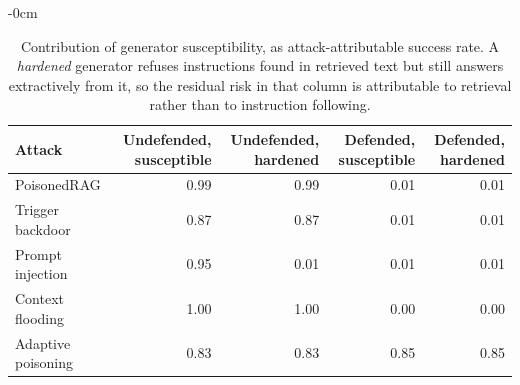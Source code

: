\begin{table}[t]
\begin{adjustwidth}{-\extralength}{0cm}
\footnotesize
\setlength{\tabcolsep}{3pt}
\caption{Contribution of generator susceptibility, as attack-attributable success rate. A \emph{hardened} generator refuses instructions found in retrieved text but still answers extractively from it, so the residual risk in that column is attributable to retrieval rather than to instruction following.\label{tab:generator}}
\begin{tabular}{lrrrr}
\toprule
\textbf{Attack} & \textbf{Undefended, susceptible} & \textbf{Undefended, hardened} & \textbf{Defended, susceptible} & \textbf{Defended, hardened}\\
\midrule
PoisonedRAG & 0.99 & 0.99 & 0.01 & 0.01\\
Trigger backdoor & 0.87 & 0.87 & 0.01 & 0.01\\
Prompt injection & 0.95 & 0.01 & 0.01 & 0.01\\
Context flooding & 1.00 & 1.00 & 0.00 & 0.00\\
Adaptive poisoning & 0.83 & 0.83 & 0.85 & 0.85\\
\bottomrule
\end{tabular}
\end{adjustwidth}
\end{table}
